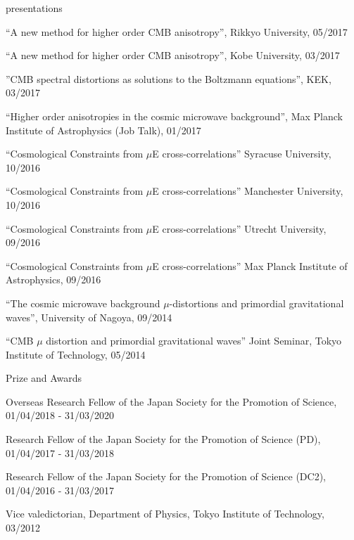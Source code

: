 \documentclass[a4paper]{resume} %
\begin{document}
\begin{rSection}{presentations}
\begin{etaremune}
    \item
    ``A new method for higher order CMB anisotropy'', Rikkyo University, 05/2017

    \item
    ``A new method for higher order CMB anisotropy'', Kobe University, 03/2017  

    \item
    ''CMB spectral distortions as solutions to the Boltzmann equations'', KEK, 03/2017  

    \item
    ``Higher order anisotropies in the cosmic microwave background'', Max Planck Institute of Astrophysics (Job Talk), 01/2017

    \item
    ``Cosmological Constraints from $\mu$E cross-correlations'' Syracuse University, 10/2016

    \item
    ``Cosmological Constraints from $\mu$E cross-correlations'' Manchester University, 10/2016 

    \item
    ``Cosmological Constraints from $\mu$E cross-correlations'' Utrecht University, 09/2016 

    \item
``Cosmological Constraints from $\mu$E cross-correlations'' Max Planck Institute of Astrophysics, 09/2016 

    \item
``The cosmic microwave background $\mu$-distortions and primordial gravitational waves'', University of Nagoya, 09/2014 

    \item 
    ``CMB $\mu$ distortion and primordial gravitational waves'' Joint Seminar, Tokyo Institute of Technology, 05/2014
\end{etaremune}

\end{rSection}


\begin{rSection}{Prize and Awards}
	\begin{etaremune}

\item Overseas Research Fellow of the Japan Society for the Promotion of Science, 01/04/2018 - 31/03/2020

    \item Research Fellow of the Japan Society for the Promotion of Science (PD), 01/04/2017 - 31/03/2018

    \item Research Fellow of the Japan Society for the Promotion of Science (DC2), 01/04/2016 - 31/03/2017

    \item
Vice valedictorian, Department of Physics, Tokyo Institute of Technology, 03/2012
    
\end{etaremune}
\end{rSection}
\end{document}
